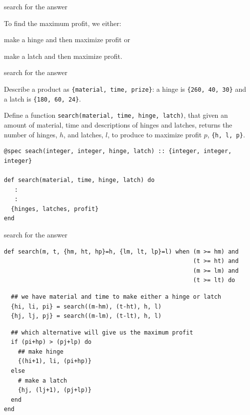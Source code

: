 \begin{frame}{search for the answer}

To find the maximum profit, we either:

\pause \vspace{20pt}\hspace{40pt}
   make a hinge and then maximize profit or

\pause \vspace{20pt}\hspace{40pt}
   make a latch and then maximize profit.

\pause \vspace{20pt}\hspace{40pt}


\end{frame}


\begin{frame}[fragile]{search for the answer}

Describe a product as {\tt \{material, time, prize\}}: a hinge is {\tt \{260, 40, 30\}} and a latch is {\tt \{180, 60, 24\}}.

\pause\vspace{20pt}

Define a function {\tt search(material, time, hinge, latch)}, that
given an amount of material, time and descriptions of hinges and
latches, returns the number of hinges, $h$, and latches, $l$, to produce to
maximize profit $p$, {\tt \{h, l, p\}}.

\pause\vspace{20pt}

\begin{verbatim}
@spec seach(integer, integer, hinge, latch) :: {integer, integer, integer}

def search(material, time, hinge, latch) do
   :
   :
  {hinges, latches, profit}
end
\end{verbatim}
\end{frame}


\begin{frame}[fragile]{search for the answer}

\begin{verbatim}
def search(m, t, {hm, ht, hp}=h, {lm, lt, lp}=l) when (m >= hm) and
                                                      (t >= ht) and
                                                      (m >= lm) and
                                                      (t >= lt) do
\end{verbatim}\pause
\begin{verbatim}
  ## we have material and time to make either a hinge or latch
  {hi, li, pi} = search((m-hm), (t-ht), h, l)
  {hj, lj, pj} = search((m-lm), (t-lt), h, l)
\end{verbatim}\pause
\begin{verbatim}
  ## which alternative will give us the maximum profit
  if (pi+hp) > (pj+lp) do
    ## make hinge
    {(hi+1), li, (pi+hp)}
  else
    # make a latch
    {hj, (lj+1), (pj+lp)}
  end
end
\end{verbatim}
\end{frame}

